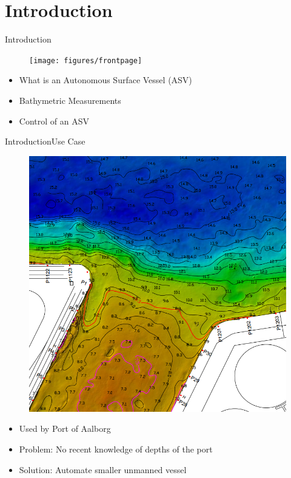 \section{Introduction}

\begin{frame}{Introduction}{}
    \begin{figure}[H]
        \centering
        \texttt{[image: figures/frontpage]}
    \end{figure}
    \begin{itemize}
         \item What is an Autonomous Surface Vessel (ASV)
         \item Bathymetric Measurements
         \item Control of an ASV
    \end{itemize}
\end{frame}

\begin{frame}{Introduction}{Use Case}
    \begin{figure}[H]
        \centering
        \includegraphics[width=.4\linewidth]{figures/smallDebthMapAalborg}
    \end{figure}
    \begin{itemize}
        \item Used by Port of Aalborg 
        \item Problem: No recent knowledge of depths of the port
        \item Solution: Automate smaller unmanned vessel
    \end{itemize}
\end{frame}

